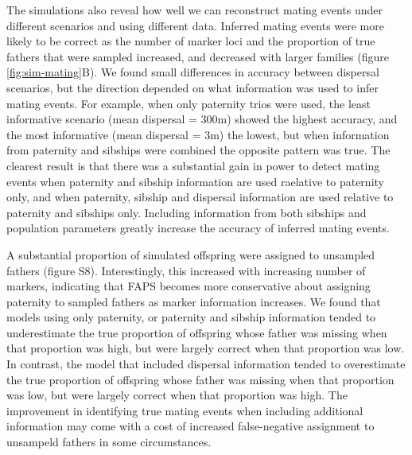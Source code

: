 \documentclass[10pt, a4paper, twocolumn]{article} %
\begin{document}
The simulations also reveal how well we can reconstruct mating events under different scenarios and using different data.
Inferred mating events were more likely to be correct as the number of marker loci and the proportion of true fathers that were sampled increased, and decreased with larger families (figure \ref{fig:sim-mating}B).
We found small differences in accuracy between dispersal scenarios, but the direction depended on what information was used to infer mating events.
For example, when only paternity trios were used, the least informative scenario (mean dispersal = 300m) showed the highest accuracy, and the most informative (mean dispersal = 3m) the lowest, but when information from paternity and sibships were combined the opposite pattern was true.
The clearest result is that there was a substantial gain in power to detect mating events when paternity and sibship information are used raelative to paternity only, and when paternity, sibship and dispersal information are used relative to paternity and sibships only.
Including information from both sibships and population parameters greatly increase the accuracy of inferred mating events.

A substantial proportion of simulated offspring were assigned to unsampled fathers (figure S8).
Interestingly, this increased with increasing number of markers, indicating that FAPS becomes more conservative about assigning paternity to sampled fathers as marker information increases.
We found that models using only paternity, or paternity and sibship information tended to underestimate the true proportion of offspring whose father was missing when that proportion was high, but were largely correct when that proportion was low.
In contrast, the model that included dispersal information tended to overestimate the true proportion of offspring whose father was missing when that proportion was low, but were largely correct when that proportion was high.
The improvement in identifying true mating events when including additional information may come with a cost of increased false-negative assignment to unsampeld fathers in some circumstances.
\end{document}
